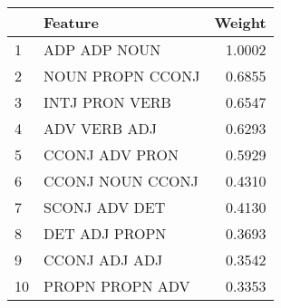 \begin{tabular}{llr}
\toprule
{} &           Feature &  Weight \\
\midrule
1  &      ADP ADP NOUN &  1.0002 \\
2  &  NOUN PROPN CCONJ &  0.6855 \\
3  &    INTJ PRON VERB &  0.6547 \\
4  &      ADV VERB ADJ &  0.6293 \\
5  &    CCONJ ADV PRON &  0.5929 \\
6  &  CCONJ NOUN CCONJ &  0.4310 \\
7  &     SCONJ ADV DET &  0.4130 \\
8  &     DET ADJ PROPN &  0.3693 \\
9  &     CCONJ ADJ ADJ &  0.3542 \\
10 &   PROPN PROPN ADV &  0.3353 \\
\bottomrule
\end{tabular}
